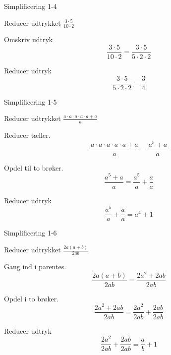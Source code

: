 \documentclass{article}
\begin{document}
\newpage

\begin{exercise}{Simplificering 1-4}

Reducer udtrykket $\frac{3 \cdot 5}{10 \cdot 2}$


\hint

Omskriv udtryk
\[
\frac{3 \cdot 5}{10 \cdot 2} = \frac{3 \cdot 5}{5 \cdot 2 \cdot 2}
\]

\hint

Reducer udtryk
\[
\frac{3 \cdot 5}{5 \cdot 2 \cdot 2} = \frac{3}{4}
\]

\end{exercise}

\newpage

\begin{exercise}{Simplificering 1-5}

Reducer udtrykket $\frac{a \cdot a \cdot a \cdot a \cdot a + a}{a}$


\hint

Reducer tæller.
\[
\frac{a \cdot a \cdot a \cdot a \cdot a + a}{a} = \frac{a^5 + a}{a}
\]

\hint

Opdel til to brøker.
\[
\frac{a^5 + a}{a} = \frac{a^5}{a} + \frac{a}{a}
\]

\hint

Reducer udtryk
\[
\frac{a^5}{a} + \frac{a}{a} = a^4 + 1
\]

\end{exercise}

\newpage

\begin{exercise}{Simplificering 1-6}

Reducer udtrykket $\frac{2a(a + b)}{2ab}$


\hint

Gang ind i parentes.
\[
\frac{2a(a + b)}{2ab} = \frac{2a^2 + 2ab}{2ab}
\]

\hint

Opdel i to brøker.
\[
\frac{2a^2 + 2ab}{2ab} = \frac{2a^2}{2ab} + \frac{2ab}{2ab}
\]

\hint

Reducer udtryk
\[
\frac{2a^2}{2ab} + \frac{2ab}{2ab} = \frac{a}{b} + 1
\]

\end{exercise}

\newpage
\end{document}
